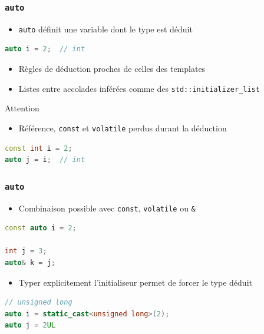 \documentclass[C++.tex]{subfiles}
\begin{document}
\begin{frame}[fragile]
	\frametitle{\lstinline|auto|}
	\begin{itemize}
		\item \lstinline|auto| définit une variable dont le type est déduit
	\end{itemize}

	\begin{lstlisting}[language=C++]
auto i = 2;  // int\end{lstlisting}

	\begin{itemize}
		\item Règles de déduction proches de celles des templates
		\item Listes entre accolades inférées comme des \lstinline|std::initializer_list|
	\end{itemize}

	\begin{alertblock}{Attention}
		\begin{itemize}
			\item Référence, \lstinline|const| et \lstinline|volatile| perdus durant la déduction
		\end{itemize}

		\begin{lstlisting}[language=C++]
const int i = 2;
auto j = i;  // int \end{lstlisting}
	\end{alertblock}
\end{frame}

\begin{frame}[fragile]
	\frametitle{\lstinline|auto|}
	\begin{itemize}
		\item Combinaison possible avec \lstinline|const|, \lstinline|volatile| ou \lstinline|&|
	\end{itemize}

	\begin{lstlisting}[language=C++]
const auto i = 2;

int j = 3;
auto& k = j;\end{lstlisting}

	\begin{itemize}
		\item Typer explicitement l'initialiseur permet de forcer le type déduit
	\end{itemize}

	\begin{lstlisting}[language=C++]
// unsigned long
auto i = static_cast<unsigned long>(2);
auto j = 2UL\end{lstlisting}
\end{frame}
\end{document}
